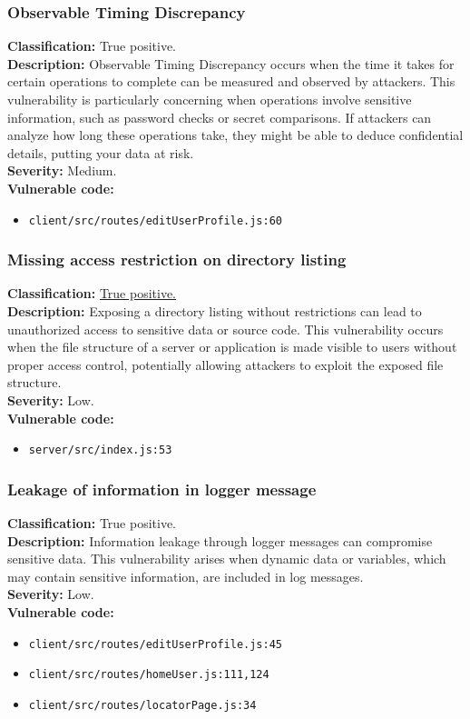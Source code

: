 \documentclass[]{article}
\begin{document}
\subsubsection{Observable Timing Discrepancy}
\textbf{Classification:} True positive. \\
\textbf{Description:} Observable Timing Discrepancy occurs when the time it takes for certain operations to complete can be measured and observed by attackers. This vulnerability is particularly concerning when operations involve sensitive information, such as password checks or secret comparisons. If attackers can analyze how long these operations take, they might be able to deduce confidential details, putting your data at risk. \\ 
\textbf{Severity:} Medium. \\ 
\textbf{Vulnerable code:}
\begin{itemize}
    \item \texttt{client/src/routes/editUserProfile.js:60}
\end{itemize}

\subsubsection{Missing access restriction on directory listing}
\textbf{Classification:} \hyperref[subsubsec:exposure_of_information_through_directory_listing]{True positive.} \\
\textbf{Description:} Exposing a directory listing without restrictions can lead to unauthorized access to sensitive data or source code. This vulnerability occurs when the file structure of a server or application is made visible to users without proper access control, potentially allowing attackers to exploit the exposed file structure. \\ 
\textbf{Severity:} Low. \\ 
\textbf{Vulnerable code:}
\begin{itemize}
    \item \texttt{server/src/index.js:53}
\end{itemize}

\subsubsection{Leakage of information in logger message}
\textbf{Classification:} True positive. \\
\textbf{Description:} Information leakage through logger messages can compromise sensitive data. This vulnerability arises when dynamic data or variables, which may contain sensitive information, are included in log messages. \\ 
\textbf{Severity:} Low. \\ 
\textbf{Vulnerable code:}
\begin{itemize}
    \item \texttt{client/src/routes/editUserProfile.js:45}
    \item \texttt{client/src/routes/homeUser.js:111,124}
    \item \texttt{client/src/routes/locatorPage.js:34}
\end{itemize}
\end{document}
